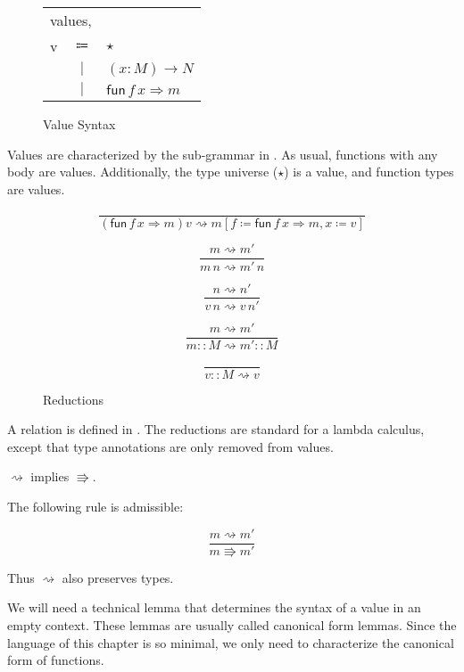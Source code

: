 \begin{figure}
\begin{tabular}{lcl}
\multicolumn{3}{l}{values,}\tabularnewline
v & $\Coloneqq$ & $\star$\tabularnewline
 & $|$ & $\left(x:M\right)\rightarrow N$\tabularnewline
 & $|$ & $\mathsf{fun}\,f\,x\Rightarrow m$\tabularnewline
\end{tabular}\caption{\SLang{} Value Syntax}
\label{fig:surface-value-syntax}
\end{figure}
 
Values are characterized by the sub-grammar in .
As usual, functions with any body are values.
Additionally, the type universe ($\star$) is a value, and function types are values.
 
\begin{figure}
\[
\frac{\,}{\left(\mathsf{fun}\,f\,x\Rightarrow m\right)v\rightsquigarrow m\left[f\coloneqq\mathsf{fun}\,f\,x\Rightarrow m,x\coloneqq v\right]}
\]
 
\[
\frac{m\rightsquigarrow m'}{m\,n\rightsquigarrow m'\,n}
\]
 
\[
\frac{n\rightsquigarrow n'}{v\,n\rightsquigarrow v\,n'}
\]
 
\[
\frac{m\rightsquigarrow m'}{m::M\rightsquigarrow m'::M}
\]
 
\[
\frac{\,}{v::M\rightsquigarrow v}
\]
 
\caption{\SLang{} \CbV{} Reductions}
\label{fig:surface-reduction-step}
\end{figure}
 
A \cbv{} relation is defined in .
The reductions are standard for a \cbv{} lambda calculus, except that type annotations are only removed from values.
 
\begin{fact} $\rightsquigarrow$ implies $\Rrightarrow$.
 
The following rule is admissible:
 
\[
\frac{m\rightsquigarrow m'}{m\Rrightarrow m'}
\]
\end{fact}
 
Thus $\rightsquigarrow$ also preserves types.
 
We will need a technical lemma that determines the syntax of a value in an empty context.
These lemmas are usually called canonical form lemmas.
Since the language of this chapter is so minimal, we only need to characterize the canonical form of functions.
 
